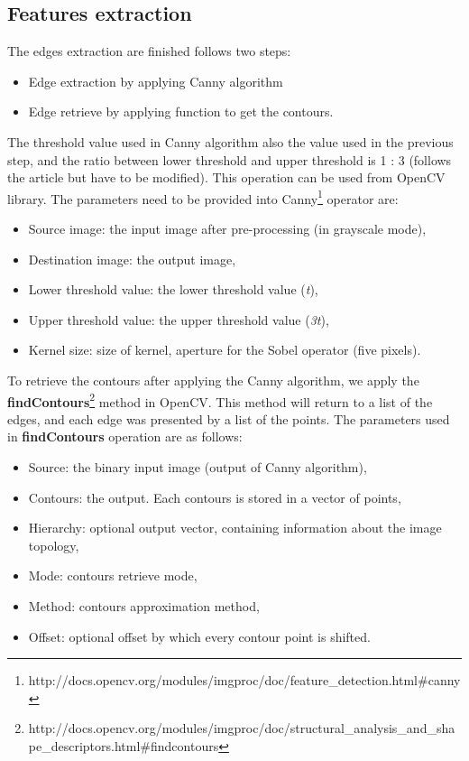 \subsection{Features extraction}
The edges extraction are finished follows two steps:
\begin{itemize}
\item Edge extraction by applying Canny algorithm
\item Edge retrieve by applying function to get the contours.
\end{itemize} 
The threshold value used in Canny algorithm also the value used in the previous step, and the ratio between lower threshold and upper threshold is 1 : 3 (follows the article \cite{palaniswamy2010automatic} but have to be modified). This operation can be used from OpenCV library. The parameters need to be provided into Canny\footnote{http://docs.opencv.org/modules/imgproc/doc/feature\_detection.html\#canny} operator are:
\begin{itemize}
\item Source image: the input image after pre-processing (in grayscale mode),
\item Destination image: the output image,
\item Lower threshold value: the lower threshold value (\textit{t}),
\item Upper threshold value: the upper threshold value (\textit{3t}),
\item Kernel size: size of kernel, aperture for the Sobel operator (five pixels).
\end{itemize}
To retrieve the contours after applying the Canny algorithm, we apply the \textbf{findContours}\footnote{http://docs.opencv.org/modules/imgproc/doc/structural\_analysis\_and\_shape\_descriptors.html\#findcontours} method in OpenCV. This method will return to a list of the edges, and each edge was presented by a list of the points. 
The parameters used in \textbf{findContours} operation are as follows:
\begin{itemize}
\item Source: the binary input image (output of Canny algorithm),
\item Contours: the output. Each contours is stored in a vector of points,
\item Hierarchy: optional output vector, containing information about the image topology,
\item Mode: contours retrieve mode,
\item Method: contours approximation method,
\item Offset: optional offset by which every contour point is shifted.
\end{itemize}
